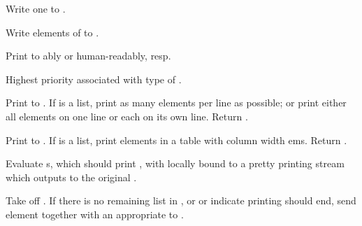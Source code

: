 \begin{LIST}{1cm}
   Write one  to .

   Write elements of  to .

  Print  to  ably or
  human-readably, resp.

  Highest priority  associated with type of .

  Print  to . If  is a list, print as
  many elements per line as possible; or print either all elements on
  one line or each on its own line. Return \retval{\NIL}.

  Print  to . If  is a list, print
  elements in a table with column width  ems.  Return \retval{\NIL}.
  
  Evaluate s, which should print , with
   locally bound to a pretty 
  printing stream which outputs to the original .

  \begin{LIST}{.5cm}

    Take  off . If there is no remaining
    list in , or  or  indicate
    printing should end, send element together with an appropriate to
    . 


\end{LIST}
\end{LIST}
